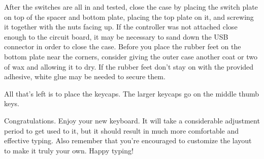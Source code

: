 \documentclass{article}
\begin{document}
After the switches are all in and tested, close the case by placing
the switch plate on top of the spacer and bottom plate, placing the
top plate on it, and screwing it together with the nuts facing up. If the
controller was not attached close enough to the circuit board, it may
be necessary to sand down the USB connector in order to close the
case. Before you place the rubber feet on the bottom plate near the
corners, consider giving the outer case another coat or two of wax and
allowing it to dry. If the rubber feet don't stay on with the provided
adhesive, white glue may be needed to secure them.

\vspace{1em}

All that's left is to place the keycaps. The larger keycaps go on the
middle thumb keys.

\vspace{1em}

Congratulations. Enjoy your new keyboard. It will take a considerable
adjustment period to get used to it, but it should result in much more
comfortable and effective typing. Also remember that you're encouraged
to customize the layout to make it truly your own. Happy typing!

\end{document}
